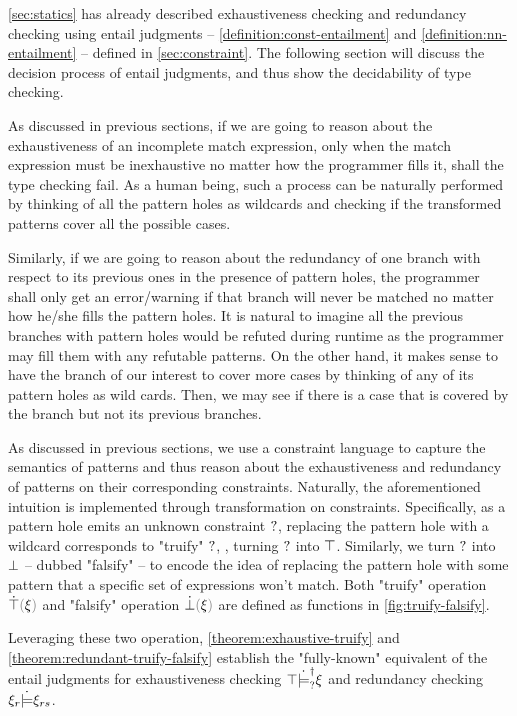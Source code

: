 \autoref{sec:statics} has already described exhaustiveness checking and redundancy checking using entail judgments -- \autoref{definition:const-entailment} and
\autoref{definition:nn-entailment} -- defined in \autoref{sec:constraint}. 
The following section will discuss the decision process of entail judgments,
and thus show the decidability of type checking.

As discussed in previous sections, if we are going to reason about the exhaustiveness of an incomplete match expression, only when the match expression must be inexhaustive no matter how the programmer fills it, shall the type checking fail. As a human being, such a process can be naturally performed by thinking of all the pattern holes as wildcards and checking if the transformed patterns cover all the possible cases. 

Similarly, if we are going to reason about the redundancy of one branch with respect to its previous ones in the presence of pattern holes, the programmer shall only get an error/warning if that branch will never be matched no matter how he/she fills the pattern holes. It is natural to imagine all the previous branches with pattern holes would be refuted during runtime as the programmer may fill them with any refutable patterns. On the other hand, it makes sense to have the branch of our interest to cover more cases by thinking of any of its pattern holes as wild cards. Then, we may see if there is a case that is covered by the branch but not its previous branches.

As discussed in previous sections, we use a constraint language to capture the semantics of patterns and thus reason about the exhaustiveness and redundancy of patterns on their corresponding constraints. Naturally, the aforementioned intuition is implemented through transformation on constraints. Specifically, as a pattern hole emits an unknown constraint $\mathtt{?}$, replacing the pattern hole with a wildcard corresponds to "truify" $\mathtt{?}$, \ie, turning $\mathtt{?}$ into $\top$. Similarly, we turn $\mathtt{?}$ into $\bot$ -- dubbed "falsify" -- to encode the idea of replacing the pattern hole with some pattern that a specific set of expressions won't match. Both "truify" operation $\ctruify{\xi}$ and "falsify" operation $\cfalsify{\xi}$ are defined as functions in \autoref{fig:truify-falsify}. 



Leveraging these two operation, \autoref{theorem:exhaustive-truify} and \autoref{theorem:redundant-truify-falsify} establish the "fully-known" equivalent of the entail judgments for exhaustiveness checking $\top \dot{\models}_{?}^{\dag} \xi$ and redundancy checking $\xi_r \dot{\models} \xi_{rs}$.

